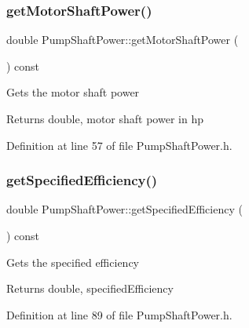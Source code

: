 \subsubsection{\texorpdfstring{get\+Motor\+Shaft\+Power()}{getMotorShaftPower()}\hspace{0.1cm}{\footnotesize\ttfamily [3/3]}}
{\footnotesize\ttfamily double Pump\+Shaft\+Power\+::get\+Motor\+Shaft\+Power (\begin{DoxyParamCaption}{ }\end{DoxyParamCaption}) const\hspace{0.3cm}{\ttfamily [inline]}}

Gets the motor shaft power \begin{DoxyReturn}{Returns}
double, motor shaft power in hp 
\end{DoxyReturn}


Definition at line 57 of file Pump\+Shaft\+Power.\+h.

\mbox{\label{class_pump_shaft_power_a93c70d2b6f70d6d98b97859fc095193a}} 
\subsubsection{\texorpdfstring{get\+Specified\+Efficiency()}{getSpecifiedEfficiency()}\hspace{0.1cm}{\footnotesize\ttfamily [1/3]}}
{\footnotesize\ttfamily double Pump\+Shaft\+Power\+::get\+Specified\+Efficiency (\begin{DoxyParamCaption}{ }\end{DoxyParamCaption}) const\hspace{0.3cm}{\ttfamily [inline]}}

Gets the specified efficiency \begin{DoxyReturn}{Returns}
double, specified\+Efficiency 
\end{DoxyReturn}


Definition at line 89 of file Pump\+Shaft\+Power.\+h.

\mbox{\label{class_pump_shaft_power_a93c70d2b6f70d6d98b97859fc095193a}} 
